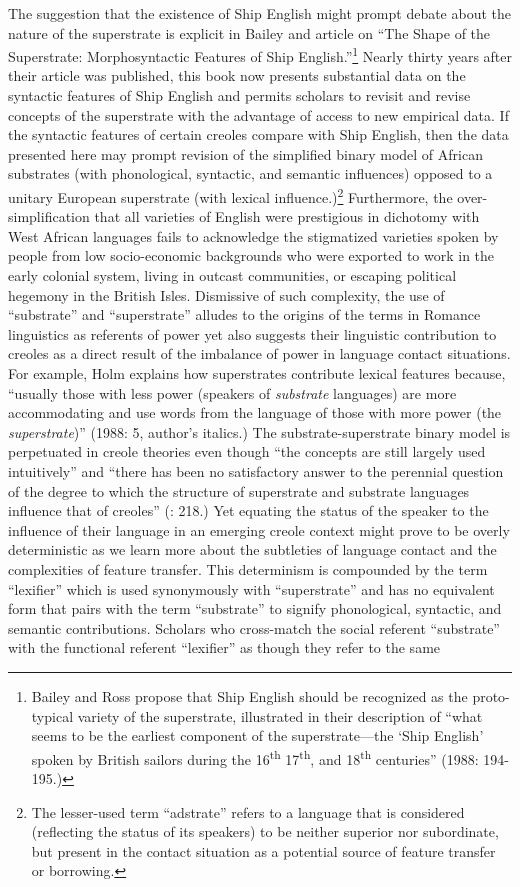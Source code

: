   The suggestion that the existence of Ship English might prompt debate about the nature of the superstrate is explicit in Bailey and  article on “The Shape of the Superstrate: Morphosyntactic Features of Ship English.”\footnote{Bailey and Ross propose that Ship English should be recognized as the proto-typical variety of the superstrate, illustrated in their description of “what seems to be the earliest component of the superstrate—the ‘Ship English’ spoken by British sailors during the 16\textsuperscript{th} 17\textsuperscript{th}, and 18\textsuperscript{th} centuries” (1988: 194-195.)}  Nearly thirty years after their article was published, this book now presents substantial data on the syntactic features of Ship English and permits scholars to revisit and revise concepts of the superstrate with the advantage of access to new empirical data. If the syntactic features of certain creoles compare with Ship English, then the data presented here may prompt revision of the simplified binary model of African substrates (with phonological, syntactic, and semantic influences) opposed to a unitary European superstrate (with lexical influence.)\footnote{The lesser-used term “adstrate” refers to a language that is considered (reflecting the status of its speakers) to be neither superior nor subordinate, but present in the contact situation as a potential source of feature transfer or borrowing.}  Furthermore, the over-simplification that all varieties of English were prestigious in dichotomy with West African languages fails to acknowledge the stigmatized varieties spoken by people from low socio-economic backgrounds who were exported to work in the early colonial system, living in outcast communities, or escaping political hegemony in the British Isles. Dismissive of such complexity, the use of “substrate” and “superstrate” alludes to the origins of the terms in Romance linguistics as referents of power yet also suggests their linguistic contribution to creoles as a direct result of the imbalance of power in language contact situations. For example, Holm explains how superstrates contribute lexical features because, “usually those with less power (speakers of \textit{substrate} languages) are more accommodating and use words from the language of those with more power (the \textit{superstrate})” (1988: 5, author’s italics.) The substrate-superstrate binary model is perpetuated in creole theories even though “the concepts are still largely used intuitively” \citep[55]{Selbach2008} and “there has been no satisfactory answer to the perennial question of the degree to which the structure of superstrate and substrate languages influence that of creoles” (\citealt{Holm2009}: 218.) Yet equating the status of the speaker to the influence of their language in an emerging creole context might prove to be overly deterministic as we learn more about the subtleties of language contact and the complexities of feature transfer. This determinism is compounded by the term “lexifier” which is used synonymously with “superstrate” and has no equivalent form that pairs with the term “substrate” to signify phonological, syntactic, and semantic contributions. Scholars who cross-match the social referent “substrate” with the functional referent “lexifier” as though they refer to the same 